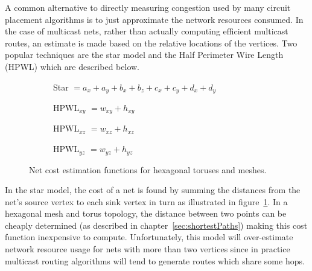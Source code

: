 				A common alternative to directly measuring congestion used by many
				circuit placement algorithms is to just approximate the network
				resources consumed. In the case of multicast nets, rather than actually
				computing efficient multicast routes, an estimate is made based on the
				relative locations of the vertices. Two popular techniques are the star
				model and the Half Perimeter Wire Length (HPWL) \cite{kahng11} which
				are described below.
				
				\begin{figure}
					\center
					\begin{subfigure}[b]{\linewidth}
						\center
						
						\caption{Star $= a_x + a_y + b_x + b_z + c_x + c_y + d_x + d_y$}
						\label{fig:cost-function-star}
					\end{subfigure}
					
					\vspace*{1.5em}
					
					\begin{subfigure}[b]{0.32\linewidth}
						\center
						
						\caption{HPWL$_{xy}$ $= w_{xy} + h_{xy}$}
						\label{fig:cost-function-hpwl-xy}
					\end{subfigure}
					\begin{subfigure}[b]{0.32\linewidth}
						\center
						
						\caption{HPWL$_{xz}$ $= w_{xz} + h_{xz}$}
						\label{fig:cost-function-hpwl-xz}
					\end{subfigure}
					\begin{subfigure}[b]{0.32\linewidth}
						\center
						
						\caption{HPWL$_{yz}$ $= w_{yz} + h_{yz}$}
						\label{fig:cost-function-hpwl-yz}
					\end{subfigure}
					
					\caption{Net cost estimation functions for hexagonal toruses and meshes.}
					\label{fig:cost-function}
				\end{figure}
				
				In the star model, the cost of a net is found by summing the distances
				from the net's source vertex to each sink vertex in turn as illustrated
				in figure~\ref{fig:cost-function-star}. In a hexagonal mesh and torus
				topology, the distance between two points can be cheaply determined (as
				described in chapter~\ref{sec:shortestPaths}) making this cost function
				inexpensive to compute. Unfortunately, this model will over-estimate
				network resource usage for nets with more than two vertices since in
				practice multicast routing algorithms will tend to generate routes
				which share some hops.
				
